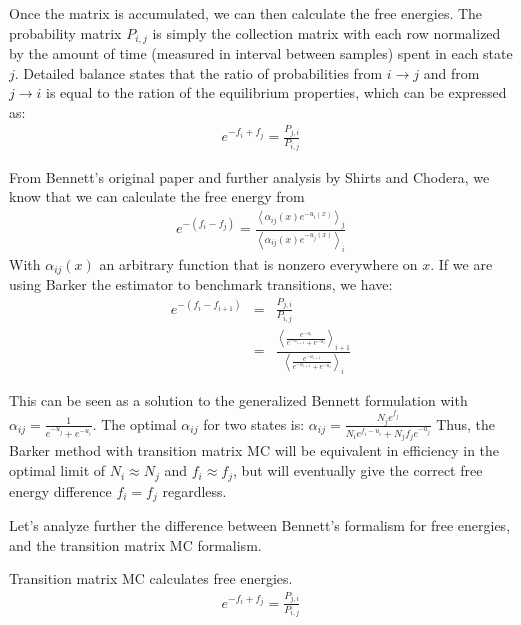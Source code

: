 \documentclass[superscriptaddress,showkeys, nofootinbib, pre, aps]{revtex4-1}
\newcommand{\expect}[1]{\left \langle #1 \right \rangle}                %
\begin{document}
Once the matrix is accumulated, we can then calculate the free energies.  The probability matrix $P_{i,j}$ is simply the collection matrix with each row normalized by the amount of time (measured in interval between samples) spent in each state $j$. Detailed balance states that the ratio of probabilities from $i\rightarrow j$ and from
$j \rightarrow i$ is equal to the ration of the equilibrium
properties, which can be expressed as:
\begin{eqnarray}
e^{-f_i+f_j} = \frac{P_{j,i}}{P_{i,j}} 
\end{eqnarray}

From Bennett's original paper and further analysis by Shirts and Chodera, we know that we can calculate the free energy from
\begin{eqnarray}
e^{-(f_i-f_j)} = \frac{\expect{\alpha_{ij}(x) e^{-u_i(x)}}_j}{\expect{\alpha_{ij}(x) e^{-u_j(x)}}_i}
\end{eqnarray}
With $\alpha_{ij}(x)$ an arbitrary function that is nonzero everywhere
on $x$. If we are using Barker the estimator to benchmark transitions, we have:
\begin{eqnarray}
e^{-(f_i-f_{i+1})} &=& \frac{P_{j,i}}{P_{i,j}} \\
                   &=& \frac{\expect{\frac{e^{-u_{i}}}{e^{-u_{i+1}}+e^{-u_i}}}_{i+1}}{\expect{\frac{e^{-u_{i+1}}}{e^{-u_{i+1}}+e^{-u_i}}}_i}
\end{eqnarray}

This can be seen as a solution to the generalized Bennett formulation
with $\alpha_{ij} = \frac{1}{e^{-u_{j}}+e^{-u_i}}$. The optimal
$\alpha_{ij}$ for two states is:
$\alpha_{ij} = \frac{N_j e^{f_j}}{N_i e^{f_i-u_{i}}+ N_j f_j e^{-u_j}}$
Thus, the Barker method with transition matrix MC will be equivalent in efficiency in the optimal limit of $N_i \approx N_j$ and $f_i \approx f_j$, but will eventually give the correct free energy difference $f_i = f_j$ regardless.  

Let's analyze further the difference between Bennett's formalism for free energies, and the transition matrix MC formalism. 

Transition matrix MC calculates free energies.
\begin{eqnarray}
e^{-f_i+f_j} = \frac{P_{j,i}}{P_{i,j}} 
\end{eqnarray}
\end{document}
